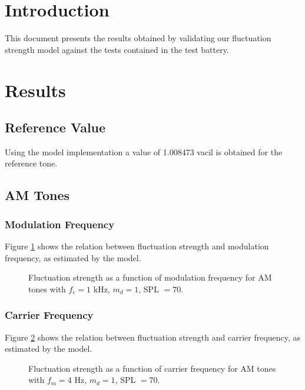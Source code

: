 \documentclass[a4paper]{article}
\begin{document}

\section{Introduction}

This document presents the results obtained by validating our fluctuation
strength model against the tests contained in the test battery.

\section{Results}

\subsection{Reference Value}

Using the model implementation a value of 1.008473 vacil is obtained for the
reference tone.

\subsection{AM Tones}

\subsubsection{Modulation Frequency}

Figure \ref{fig:AMtonesfmplot} shows the relation between fluctuation strength
and modulation frequency, as estimated by the model.

\begin{figure}[ht]
    \centering
    \resizebox{!}{8cm}{
        
    }
    \caption{Fluctuation strength as a function of modulation frequency for AM
        tones with $f_c = 1 $ kHz, $m_d = 1$, SPL $= 70$.}
    \label{fig:AMtonesfmplot}
\end{figure}

\subsubsection{Carrier Frequency}

Figure \ref{fig:AMtonesfcplot} shows the relation between fluctuation strength
and carrier frequency, as estimated by the model.

\begin{figure}[ht]
    \centering
    \resizebox{!}{8cm}{
        
    }
    \caption{Fluctuation strength as a function of carrier frequency for AM
        tones with $f_m = 4 $ Hz, $m_d = 1$, SPL $= 70$.}
    \label{fig:AMtonesfcplot}
\end{figure}
\end{document}
